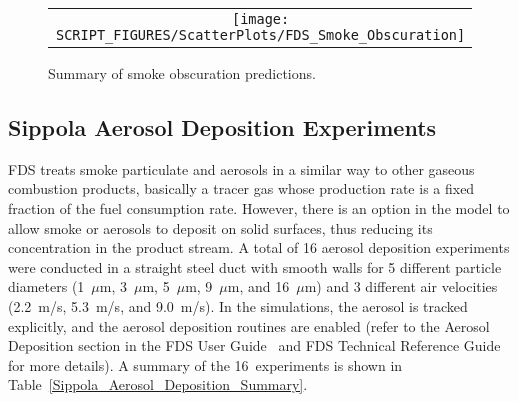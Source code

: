 \newpage

\begin{figure}[p]
\begin{center}
\begin{tabular}{c}
\texttt{[image: SCRIPT\_FIGURES/ScatterPlots/FDS\_Smoke\_Obscuration]}
\end{tabular}
\end{center}
\caption[Summary of smoke obscuration predictions]{Summary of smoke obscuration predictions.}
\end{figure}


\clearpage

\subsection{Sippola Aerosol Deposition Experiments}
\label{Aerosol Deposition Velocity}

FDS treats smoke particulate and aerosols in a similar way to other gaseous combustion products, basically a tracer gas whose production rate is a fixed fraction of the fuel consumption rate. However, there is an option in the model to allow smoke or aerosols to deposit on solid surfaces, thus reducing its concentration in the product stream. A total of 16 aerosol deposition experiments were conducted in a straight steel duct with smooth walls for 5 different particle diameters (1~$\mu$m, 3~$\mu$m, 5~$\mu$m, 9~$\mu$m, and 16~$\mu$m) and 3 different air velocities (2.2~m/s, 5.3~m/s, and 9.0~m/s). In the simulations, the aerosol is tracked explicitly, and the aerosol deposition routines are enabled (refer to the Aerosol Deposition section in the FDS User Guide~\cite{FDS_Users_Guide} and FDS Technical Reference Guide~\cite{FDS_Math_Guide} for more details). A summary of the 16~experiments is shown in Table~\ref{Sippola_Aerosol_Deposition_Summary}.

